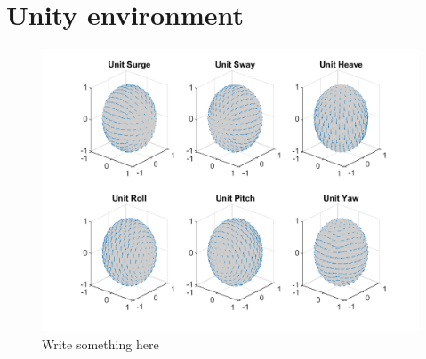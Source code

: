 \documentclass{UoNMCHA}
\numberwithin{equation}{section}
\begin{document}
\section{Unity environment}\label{app:unityEnvironment}
\begin{figure}[ht]
    \begin{center}
        \includegraphics[width=.6\linewidth]{Figures/Unit_Movement}%
        \caption{Write something here}
        \label{fig:UnityEnvironment}
    \end{center}
\end{figure}
\end{document}
